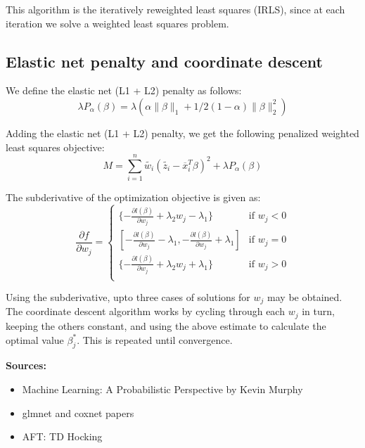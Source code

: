\documentclass[12pt,a4paper]{report}
\begin{document}
This algorithm is the iteratively reweighted least squares (IRLS), since at each iteration we solve a weighted least squares problem.

\subsection{Elastic net penalty and coordinate descent}
We define the elastic net (L1 + L2) penalty as follows:
\begin{equation} \label{objective}
\lambda P_{\alpha}(\beta) = \lambda(\alpha \|\beta\|_1 + 1/2 (1-\alpha) \|\beta\|_2^2)
\end{equation}

Adding the elastic net (L1 + L2) penalty, we get the following penalized weighted least squares objective:
\begin{equation} \label{objective}
M = \sum_{i=1}^n \widetilde{w_i} (\widetilde{z_i} - \overline x_i^T \beta)^2
	 + \lambda P_{\alpha}(\beta)
\end{equation}

The subderivative of the optimization objective is given as:
\begin{equation} \label{subderivative}
\frac{\partial{f}}{\partial{w_j}} = \begin{cases}
										\{-\frac{\partial{l(\beta)}}{\partial{w_j}} + \lambda_2 w_j -\lambda_1\} & \mbox{if }  w_j<0 \\
										[-\frac{\partial{l(\beta)}}{\partial{w_j}} -\lambda_1, -\frac{\partial{l(\beta)}}{\partial{w_j}} +\lambda_1] & \mbox{if }  w_j=0 \\
										\{-\frac{\partial{l(\beta)}}{\partial{w_j}} + \lambda_2 w_j +\lambda_1\} & \mbox{if } w_j>0 \\
									\end{cases}
\end{equation}

Using the subderivative, upto three cases of solutions for $w_j$ may be obtained. The coordinate descent algorithm works by
cycling through each $w_j$ in turn, keeping the others constant, and using the above estimate to calculate the optimal value
$\beta^*_j$. This is repeated until convergence.

\vspace{8mm}
\textbf{Sources:}
\begin{itemize}
\item Machine Learning: A Probabilistic Perspective by Kevin Murphy
\item glmnet and coxnet papers
\item AFT: TD Hocking
\end{itemize}
\end{document}
